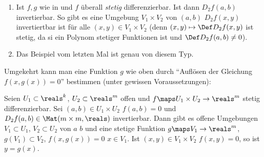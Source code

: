 \begin{bemerkungen*}
  \begin{enumerate}
    \item Ist \( f,g \) wie in  und \( f \) überall \emph{stetig} differenzierbar. Ist dann \( D_2 f(a,b) \) invertierbar. So gibt es eine Umgebung \( V_1\times V_2 \) von \( (a,b) \) \sd \( D_2f(x,y) \) invertiertbar ist für alle \( (x,y)\in V_1\times V_2 \) (denn \( (x,y)\mapsto \text{\Def}D_2f(x,y) \) ist stetig, da si ein Polynom stetiger Funktionen ist und \( \text{\Def} D_2 f(a,b)\neq 0 \)).
    \item Das Beispiel vom letzten Mal ist genau von diesem Typ.
  \end{enumerate}
\end{bemerkungen*}
Umgekehrt kann man eine Funktion \( g \) wie oben durch \enquote{Auflösen der Gleichung \( f(x,g(x))=0 \)} bestimmen (unter gewissen Voraussetzungen):
\begin{satz}\label{satz_von_der_impliziten_funktion}
  Seien \( U_1\subset \reals^k \), \( U_2\subset \reals^m \) offen und \( f\maps U_1\times U_2\to \reals^m \) stetig differenzierbar. Sei \( (a,b) \in U_1\times U_2 \) \sd \( f(a,b)=0 \) und \( D_2f(a,b)\in \Mat(m \times m,\reals) \) invertierbar. Dann gibt es offene Umgebungen \( V_1\subset U_1 \), \( V_2\subset U_2 \) von \( a \) \bzw \( b \) und eine stetige Funktion \( g\maps V_1\to \reals^m \), \( g(V_1)\subset V_2 \), \sd \( f(x,g(x))=0 \) \tforall  \( x\in V_1 \). Ist \( (x,y)\in V_1\times V_2 \) \sd \( f(x,y)=0 \), so ist \( y=g(x) \).
\end{satz}
